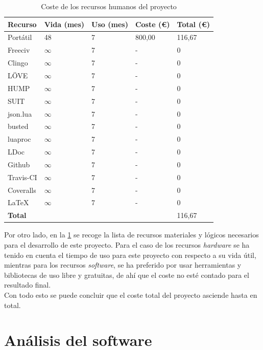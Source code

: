 \begin{table}[!h]
	\centering
	\begin{tabularx}{\textwidth}{ X X X X X }
		\bfseries{Recurso} & \bfseries{Vida (mes)} & \bfseries{Uso (mes)} & \bfseries{Coste (\euro)} & \bfseries{Total (\euro)} \\
		\hline
		Portátil & 48 & 7 & 800,00 & 116,67 \\
		Freeciv & $\infty$ & 7 & - & 0 \\
		Clingo & $\infty$ & 7 & - & 0 \\
		LÖVE & $\infty$ & 7 & - & 0 \\
		HUMP & $\infty$ & 7 & - & 0 \\
		SUIT & $\infty$ & 7 & - & 0 \\
		json.lua & $\infty$ & 7 & - & 0 \\
		busted & $\infty$ & 7 & - & 0 \\
		luaproc & $\infty$ & 7 & - & 0 \\
		LDoc & $\infty$ & 7 & - & 0 \\
		Github & $\infty$ & 7 & - & 0 \\
		Travis-CI & $\infty$ & 7 & - & 0 \\
		Coveralls & $\infty$ & 7 & - & 0 \\
		LaTeX & $\infty$ & 7 & - & 0 \\
		\hline
		\bfseries{Total} & & & & 116,67 \\
		\hline
	\end{tabularx}
	\caption{Coste de los recursos humanos del proyecto}\label{table:costematerial}
\end{table}

Por otro lado, en la \ref{table:costematerial} se recoge la lista de recursos materiales y lógicos necesarios para el desarrollo de este proyecto. Para el caso de los recursos \textit{hardware} se ha tenido en cuenta el tiempo de uso para este proyecto con respecto a su vida útil, mientras para los recursos \textit{software}, se ha preferido por usar herramientas y bibliotecas de uso libre y gratuitas, de ahí que el coste no esté contado para el resultado final. \\

Con todo esto se puede concluir que el coste total del proyecto asciende hasta  en total.

\section{Análisis del software}

